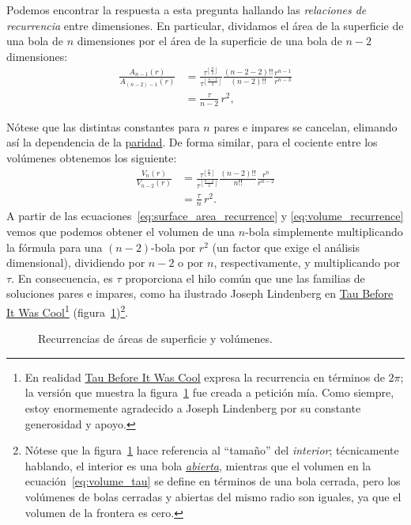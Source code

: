 Podemos encontrar la respuesta a esta pregunta hallando las \emph{relaciones de recurrencia} entre dimensiones. En particular, dividamos el área de la superficie de una bola de $n$ dimensiones por el área de la superficie de una bola de $n-2$ dimensiones:
\begin{equation}
  \label{eq:surface_area_recurrence}
  \begin{split}
  \frac{A_{n-1}(r)}{A_{(n-2)-1}(r)} & =
  \frac{\tau^{\left\lfloor \frac{n}{2} \right\rfloor}}{\tau^{\left\lfloor \frac{n-2}{2} \right\rfloor}}
  \frac{(n-2-2)!!}{(n-2)!!}
  \frac{r^{n-1}}{r^{n-3}}
  \\ & = \frac{\tau}{n-2}\,r^2,
  \end{split}
\end{equation}

Nótese que las distintas constantes para $n$ pares e impares se cancelan, elimando así la dependencia de la \href{https://es.wikipedia.org/wiki/N%C3%BAmeros_pares_e_impares}{paridad}. De forma similar, para el cociente entre los volúmenes obtenemos los siguiente:
\begin{equation}
\label{eq:volume_recurrence}
\begin{split}
\frac{V_n(r)}{V_{n-2}(r)} & =
\frac{\tau^{\left\lfloor \frac{n}{2} \right\rfloor}}{\tau^{\left\lfloor \frac{n-2}{2} \right\rfloor}}
\frac{(n-2)!!}{n!!}
\frac{r^{n}}{r^{n-2}}
\\ & = \frac{\tau}{n}\,r^2.
\end{split}
\end{equation}
A partir de las ecuaciones~\eqref{eq:surface_area_recurrence} y \eqref{eq:volume_recurrence} vemos que podemos obtener el volumen de una $n$-bola simplemente multiplicando la fórmula para una $(n-2)$-bola por $r^2$ (un factor que exige el análisis dimensional), dividiendo por $n-2$ o por $n$, respectivamente, y multiplicando por $\tau$. En consecuencia, es $\tau$ proporciona el hilo común que une las familias de soluciones pares e impares, como ha ilustrado Joseph Lindenberg en \href{http://sites.google.com/site/taubeforeitwascool/}{Tau Before It Was Cool}\footnote{En realidad \href{https://sites.google.com/site/taubeforeitwascool/}{Tau Before It Was Cool} expresa la recurrencia en términos de $2\pi$; la versión que muestra la figura~\ref{fig:Nspheres} fue creada a petición mía. Como siempre, estoy enormemente agradecido a Joseph Lindenberg por su constante generosidad y apoyo.} (figura~\ref{fig:Nspheres})\footnote{Nótese que la figura~\ref{fig:Nspheres} hace referencia al ``tamaño'' del \emph{interior}; técnicamente hablando, el interior es una bola \href{https://es.wikipedia.org/wiki/Conjunto_abierto}{\emph{abierta}}, mientras que el volumen en la ecuación~\eqref{eq:volume_tau} se define en términos de una bola cerrada, pero los volúmenes de bolas cerradas y abiertas del mismo radio son iguales, ya que el volumen de la frontera es cero.}.
\begin{figure}
\caption{Recurrencias de áreas de superficie y volúmenes.\label{fig:Nspheres}}
\end{figure}


